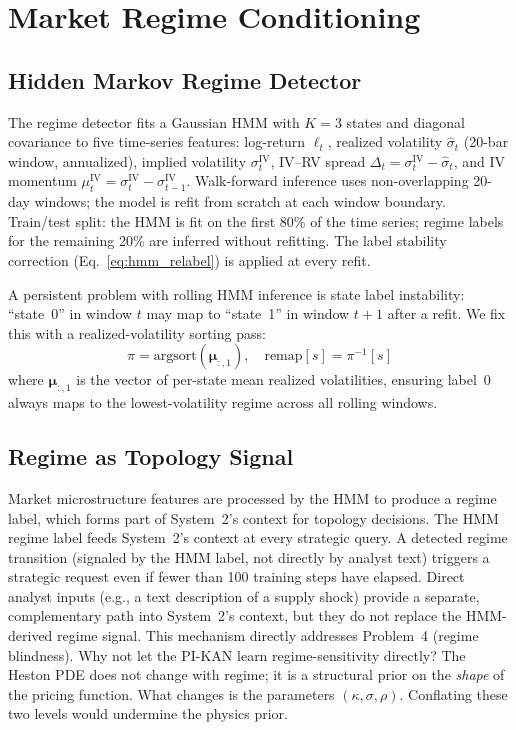 \documentclass[11pt,a4paper]{article}
\begin{document}
\section{Market Regime Conditioning}
\label{sec:regime}

\subsection{Hidden Markov Regime Detector}
\label{sec:regime:hmm}

The regime detector fits a Gaussian HMM with $K=3$ states and diagonal covariance to
five time-series features: log-return $\ell_t$, realized volatility $\hat{\sigma}_t$
(20-bar window, annualized), implied volatility $\sigma^\text{IV}_t$, IV--RV spread
$\Delta_t = \sigma^\text{IV}_t - \hat{\sigma}_t$, and IV momentum
$\mu^\text{IV}_t = \sigma^\text{IV}_t - \sigma^\text{IV}_{t-1}$.
Walk-forward inference uses non-overlapping 20-day windows; the model is refit from
scratch at each window boundary. Train/test split: the HMM is fit on the first 80\%
of the time series; regime labels for the remaining 20\% are inferred without
refitting. The label stability correction (Eq.~\ref{eq:hmm_relabel}) is applied at
every refit.

A persistent problem with rolling HMM inference is state label instability: ``state~0''
in window $t$ may map to ``state~1'' in window $t+1$ after a refit. We fix this with
a realized-volatility sorting pass:
\begin{equation}
\pi = \text{argsort}(\bm{\mu}_{:,1}), \quad \text{remap}[s] = \pi^{-1}[s]
\label{eq:hmm_relabel}
\end{equation}
where $\bm{\mu}_{:,1}$ is the vector of per-state mean realized volatilities, ensuring
label~0 always maps to the lowest-volatility regime across all rolling windows.

\subsection{Regime as Topology Signal}
\label{sec:regime:signal}

Market microstructure features are processed by the HMM to produce a regime label,
which forms part of System~2's context for topology decisions. The HMM regime label
feeds System~2's context at every strategic query. A detected regime transition
(signaled by the HMM label, not directly by analyst text) triggers a strategic request
even if fewer than 100 training steps have elapsed. Direct analyst inputs (e.g., a
text description of a supply shock) provide a separate, complementary path into
System~2's context, but they do not replace the HMM-derived regime signal. This
mechanism directly addresses Problem~4 (regime blindness). Why not let the PI-KAN
learn regime-sensitivity directly? The Heston PDE does not change with regime; it is
a structural prior on the \emph{shape} of the pricing function. What changes is the
parameters $(\kappa, \sigma, \rho)$. Conflating these two levels would undermine the
physics prior.
\end{document}
